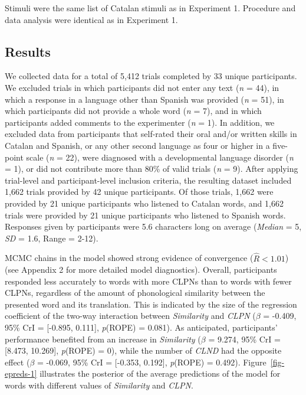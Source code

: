 \documentclass[
]{article}
\begin{document}
Stimuli were the same list of Catalan stimuli as in Experiment 1.
Procedure and data analysis were identical as in Experiment 1.

\subsection{Results}\label{results-1}

We collected data for a total of 5,412 trials completed by 33 unique
participants. We excluded trials in which participants did not enter any
text (\emph{n} = 44), in which a response in a language other than
Spanish was provided (\emph{n} = 51), in which participants did not
provide a whole word (\emph{n} = 7), and in which participants added
comments to the experimenter (\emph{n} = 1). In addition, we excluded
data from participants that self-rated their oral and/or written skills
in Catalan and Spanish, or any other second language as four or higher
in a five-point scale (\emph{n} = 22), were diagnosed with a
developmental language disorder (\emph{n} = 1), or did not contribute
more than 80\% of valid trials (\emph{n} = 9). After applying
trial-level and participant-level inclusion criteria, the resulting
dataset included 1,662 trials provided by 42 unique participants. Of
those trials, 1,662 were provided by 21 unique participants who listened
to Catalan words, and 1,662 trials were provided by 21 unique
participants who listened to Spanish words. Responses given by
participants were 5.6 characters long on average (\emph{Median} = 5,
\emph{SD} = 1.6, Range = 2-12).

MCMC chains in the model showed strong evidence of convergence
(\(\hat{R}<1.01\)) (see Appendix 2 for more detailed model diagnostics).
Overall, participants responded less accurately to words with more CLPNs
than to words with fewer CLPNs, regardless of the amount of phonological
similarity between the presented word and its translation. This is
indicated by the size of the regression coefficient of the two-way
interaction between \emph{Similarity} and \emph{CLPN} (\(\beta\) =
-0.409, 95\% CrI = {[}-0.895, 0.111{]}, \emph{p}(ROPE) = 0.081). As
anticipated, participants' performance benefited from an increase in
\emph{Similarity} (\(\beta\) = 9.274, 95\% CrI = {[}8.473, 10.269{]},
\emph{p}(ROPE) = 0), while the number of \emph{CLND} had the opposite
effect (\(\beta\) = -0.069, 95\% CrI = {[}-0.353, 0.192{]},
\emph{p}(ROPE) = 0.492). Figure~\ref{fig-epreds-1} illustrates the
posterior of the average predictions of the model for words with
different values of \emph{Similarity} and \emph{CLPN}.
\end{document}
